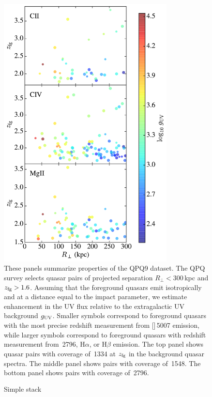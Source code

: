 \documentclass[iop]{emulateapj}
\begin{document}
\begin{figure}
\includegraphics[width=3.5in]{Figures/fig_experiment.pdf}
\caption{These panels summarize properties of the QPQ9 dataset. The QPQ survey selects 
quasar pairs of projected separation $R_\perp < 300$\,kpc and $z_{\rm fg}>1.6$. Assuming that the 
foreground quasars emit isotropically and at a distance equal to the impact parameter, we estimate 
enhancement in the UV flux relative to the extragalactic UV background $g_{\rm UV}$. Smaller 
symbols correspond to foreground quasars with the most precise redshift measurement from 
[]\,5007 emission, while larger symbols correspond to foreground quasars with redshift 
measurement from \,2796, H$\alpha$, or H$\beta$ emission. The top panel shows 
quasar pairs with coverage of \,1334 at $z_{\rm fg}$ in the background quasar spectra. 
The middle panel shows pairs with coverage of \,1548. The bottom panel shows 
pairs with coverage of \,2796. 
}
\label{fig:experiment}
\end{figure}

\begin{figure}
\caption{Simple stack
}
\label{fig:stack}
\end{figure}
\end{document}
